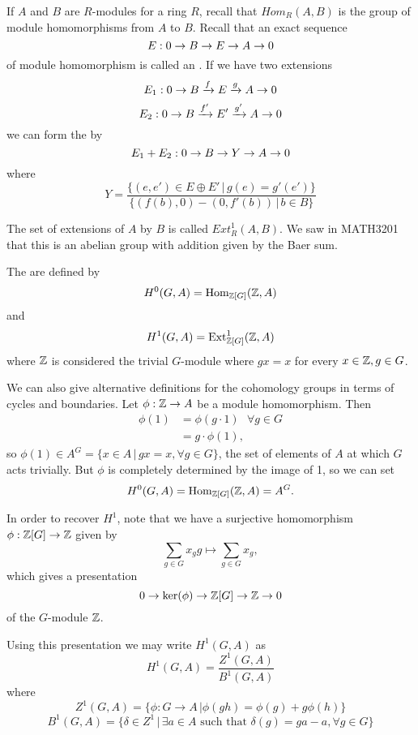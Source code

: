 \documentclass[12pt, a4paper]{report}
\begin{document}
If $A$ and $B$ are $R$-modules for a ring $R$, recall that
$Hom_R(A,B)$ is the group of module homomorphisms from $A$ to $B$.
Recall that an exact sequence
\[E: 0 \rightarrow B \rightarrow E \rightarrow A \rightarrow 0\]
of module homomorphism is called an . If we have
two extensions
\[E_1: 0 \rightarrow B \xrightarrow[]{f} E \xrightarrow[]{g} A \rightarrow 0\]
\[E_2: 0 \rightarrow B \xrightarrow[]{f'} E' \xrightarrow[]{g'} A \rightarrow 0\]
we can form the  by
\[E_1 + E_2 : 0 \rightarrow B \rightarrow Y \rightarrow A \rightarrow 0\]
where
\[Y = \frac{\{(e,e') \in E \oplus E' \, | \, g(e) = g'(e')\}}{\{
    (f(b),0) - (0, f'(b)) \, | \, b \in B\}}\]

The set of extensions of $A$ by $B$ is called $Ext^1_R (A,B).$ We saw in
MATH3201 that this is an abelian group with addition given by the Baer sum.

\begin{defn}
  The  are defined by
  \[H^0 (G, A) = \text{Hom}_{{\mathbb Z}[G]}({\mathbb Z}, A)\] and
  \[H^1 (G, A) = \text{Ext}^1_{{\mathbb Z}[G]} ({\mathbb Z}, A)\] where ${\mathbb Z}$ is considered the
  trivial $G$-module where $g x = x$ for every $x \in {\mathbb Z}, g \in G$. 
\end{defn}

We can also give alternative definitions for the cohomology groups in terms of
cycles and boundaries.
Let $\phi : {\mathbb Z} \rightarrow A$ be a module homomorphism. Then
\[\begin{split} \phi(1) &= \phi(g \cdot 1) \,\,\,\, \forall g \in G \\
    &= g \cdot \phi(1) , \end{split}\]
so $\phi(1) \in A^G = \{x \in A \, | \, gx = x, \forall g \in G\}$, the set
of elements of $A$ at which $G$ acts trivially. But $\phi$ is
completely determined by the image of 1, so we can set
\[ H^0 (G, A) = \text{Hom}_{{\mathbb Z}[G]}({\mathbb Z}, A) = A^G .\] 

In order to recover $H^1$, note that
we have a surjective homomorphism $\phi: {\mathbb Z}[G] \rightarrow {\mathbb Z}$ given by
\[\sum\limits_{g \in G} x_gg \mapsto \sum\limits_{g \in G} x_g,\]
which gives a presentation
\[0 \rightarrow \text{ker}(\phi) \rightarrow {\mathbb Z}[G] \rightarrow {\mathbb Z} \rightarrow 0\]
of the $G$-module ${\mathbb Z}$. 

Using this presentation we may write $H^1(G,A)$ as 
\[H^1(G, A) = \frac{Z^1(G,A)}{B^1(G,A)}\]
where
\[Z^1(G,A) = \{ \phi : G \rightarrow A \, | \phi(gh) = \phi(g) + g \phi(h)\}\]
\[B^1(G,A) = \{ \delta \in Z^1 \, | \, \exists a \in A \,\,\text{such that}\,\, \delta(g)
  = ga - a , \forall g \in G\}\]
\end{document}
